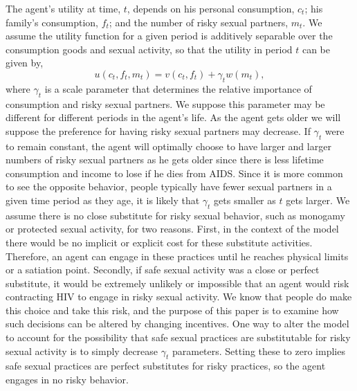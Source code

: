 \documentclass[12pt]{article}
\newcommand{\beq}{\begin{equation}}
\newcommand{\eeq}{\end{equation}}
\begin{document}
The agent's utility at time, $t$, depends on his personal consumption, $c_t$; his family's consumption, $f_t$; and the number of risky sexual partners, $m_t$.  We assume the utility function for a given period is additively separable over the consumption goods and sexual activity, so that the utility in period $t$ can be given by,
\beq \label{eq:util} u(c_t, f_t, m_t) = v(c_t, f_t) + \gamma_t w(m_t), \eeq
where $\gamma_t$ is a scale parameter that determines the relative importance of consumption and risky sexual partners.  We suppose this parameter may be different for different periods in the agent's life.  As the agent gets older we will suppose the preference for having risky sexual partners may decrease.  If $\gamma_t$ were to remain constant, the agent will optimally choose to have larger and larger numbers of risky sexual partners as he gets older since there is less lifetime consumption and income to lose if he dies from AIDS.  Since it is more common to see the opposite behavior, people typically have fewer sexual partners in a given time period as they age, it is likely that $\gamma_t$ gets smaller as $t$ gets larger.  We assume there is no close substitute for risky sexual behavior, such as monogamy or protected sexual activity, for two reasons.  First, in the context of the model there would be no implicit or explicit cost for these substitute activities.  Therefore, an agent can engage in these practices until he reaches physical limits or a satiation point.  Secondly, if safe sexual activity was a close or perfect substitute, it would be extremely unlikely or impossible that an agent would risk contracting HIV to engage in risky sexual activity.  We know that people do make this choice and take this risk, and the purpose of this paper is to examine how such decisions can be altered by changing incentives.  One way to alter the model to account for the possibility that safe sexual practices are substitutable for risky sexual activity is to simply decrease $\gamma_t$ parameters.  Setting these to zero implies safe sexual practices are perfect substitutes for risky practices, so the agent engages in no risky behavior.
\end{document}

